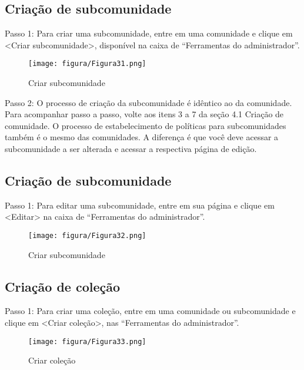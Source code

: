 \documentclass[12pt,hidelinks]{article}
\begin{document}
  \subsection{Criação de subcomunidade}  
  
  Passo 1: Para criar uma subcomunidade, entre em uma comunidade e clique em <Criar subcomunidade>, disponível na caixa de “Ferramentas do administrador”.
  
  \begin{figure}[!htp]
                \centering
                \texttt{[image: figura/Figura31.png]}
                \caption{Criar subcomunidade}
            \label{Rotulo}
        \end{figure}
    
    Passo 2: O processo de criação da subcomunidade é idêntico ao da comunidade. Para acompanhar passo a passo, volte aos itens 3 a 7 da seção 4.1 Criação de comunidade. O processo de estabelecimento de políticas para subcomunidades também é o mesmo das comunidades. A diferença é que você deve acessar a subcomunidade a ser alterada e acessar a respectiva página de edição.
    
    \subsection{Criação de subcomunidade} 
    
    Passo 1: Para editar uma subcomunidade, entre em sua página e clique em <Editar> na caixa de “Ferramentas do administrador”.
    
    \begin{figure}[!htp]
                \centering
                \texttt{[image: figura/Figura32.png]}
                \caption{Criar subcomunidade}
            \label{Rotulo}
        \end{figure}

\newpage  
    \subsection{Criação de coleção}
    
    Passo 1: Para criar uma coleção, entre em uma comunidade ou subcomunidade e clique em <Criar coleção>, nas “Ferramentas do administrador”.
    
    \begin{figure}[!htp]
                \centering
                \texttt{[image: figura/Figura33.png]}
                \caption{Criar coleção}
            \label{Rotulo}
        \end{figure}
\end{document}
